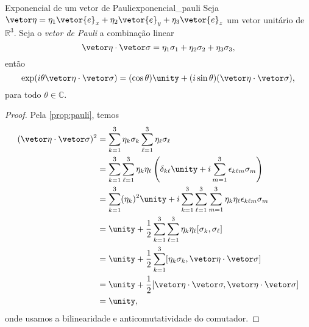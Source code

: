 \begin{proposition}{Exponencial de um vetor de Pauli}{exponencial_pauli}
    Seja \(\vetor\eta = \eta_1 \vetor{e}_x + \eta_2\vetor{e}_y + \eta_3 \vetor{e}_z\) um vetor unitário de \(\mathbb{R}^3\). Seja o \emph{vetor de Pauli} a combinação linear
    \begin{equation*}
        \vetor\eta \cdot \vetor\sigma = \eta_1 \sigma_1 + \eta_2 \sigma_2 + \eta_3 \sigma_3,
    \end{equation*}
    então
    \begin{equation*}
        \exp(i \theta \vetor\eta \cdot \vetor\sigma) = (\cos\theta)\unity + (i\sin\theta)(\vetor\eta \cdot\vetor\sigma),
    \end{equation*}
    para todo \(\theta\in \mathbb{C}.\)
\end{proposition}
\begin{proof}
    Pela \cref{prop:pauli}, temos
    \begin{align*}
        (\vetor \eta \cdot \vetor \sigma)^2 &= \sum_{k=1}^3 \eta_k \sigma_k \sum_{\ell = 1}^3 \eta_\ell \sigma_\ell\\
                                        &= \sum_{k=1}^3\sum_{\ell=1}^3 \eta_k \eta_\ell \left(\delta_{k\ell}\unity + i \sum_{m = 1}^3 \epsilon_{k\ell m}\sigma_m\right)\\
                                        &= \sum_{k=1}^3 (\eta_k)^2 \unity + i\sum_{k=1}^3\sum_{\ell=1}^3 \sum_{m = 1}^3 \eta_k \eta_\ell\epsilon_{k\ell m}\sigma_m\\
                                        &= \unity + \frac12 \sum_{k=1}^3\sum_{\ell=1}^3 \eta_k \eta_\ell [\sigma_k, \sigma_\ell]\\
                                        &= \unity + \frac12 \sum_{k=1}^3 [\eta_k \sigma_k, \vetor \eta \cdot \vetor \sigma]\\
                                        &= \unity + \frac12 [\vetor \eta\cdot \vetor \sigma, \vetor \eta\cdot \vetor \sigma]\\
                                        &= \unity,
    \end{align*}
    onde usamos a bilinearidade e anticomutatividade do comutador.


\end{proof}
